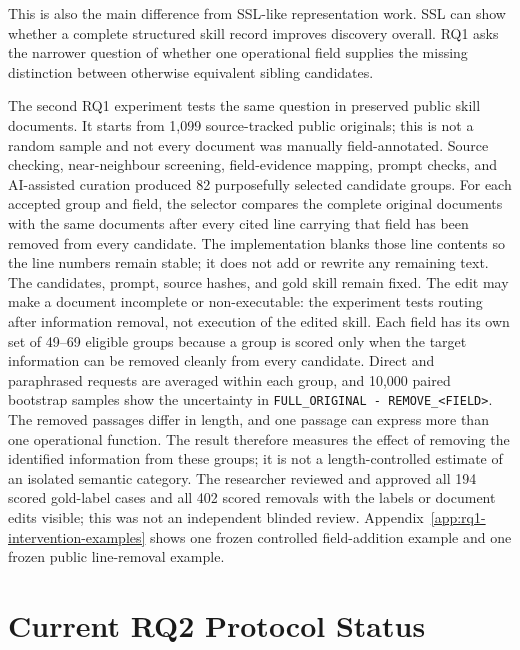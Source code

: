 This is also the main difference from SSL-like representation work. SSL can show whether a complete structured skill record improves discovery overall. RQ1 asks the narrower question of whether one operational field supplies the missing distinction between otherwise equivalent sibling candidates.

The second RQ1 experiment tests the same question in preserved public skill documents. It starts from 1,099 source-tracked public originals; this is not a random sample and not every document was manually field-annotated. Source checking, near-neighbour screening, field-evidence mapping, prompt checks, and AI-assisted curation produced 82 purposefully selected candidate groups. For each accepted group and field, the selector compares the complete original documents with the same documents after every cited line carrying that field has been removed from every candidate. The implementation blanks those line contents so the line numbers remain stable; it does not add or rewrite any remaining text. The candidates, prompt, source hashes, and gold skill remain fixed. The edit may make a document incomplete or non-executable: the experiment tests routing after information removal, not execution of the edited skill. Each field has its own set of 49--69 eligible groups because a group is scored only when the target information can be removed cleanly from every candidate. Direct and paraphrased requests are averaged within each group, and 10,000 paired bootstrap samples show the uncertainty in \texttt{FULL\_ORIGINAL - REMOVE\_<FIELD>}. The removed passages differ in length, and one passage can express more than one operational function. The result therefore measures the effect of removing the identified information from these groups; it is not a length-controlled estimate of an isolated semantic category. The researcher reviewed and approved all 194 scored gold-label cases and all 402 scored removals with the labels or document edits visible; this was not an independent blinded review. Appendix~\ref{app:rq1-intervention-examples} shows one frozen controlled field-addition example and one frozen public line-removal example.

\section{Current RQ2 Protocol Status}

